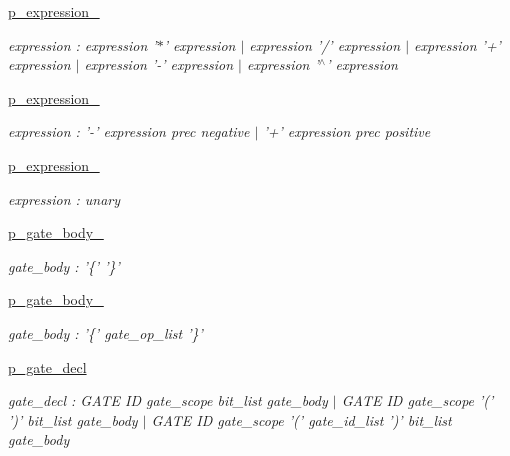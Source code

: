 \begin{DoxyCompactItemize}
\hyperlink{namespaceqat_1_1interop_1_1qasm__parser_1_1OqasmParser_1_1p__expression__0}{p\-\_\-expression\-\_}
\begin{DoxyCompactList}\small\item\em expression \-: expression '$\ast$' expression $|$ expression '/' expression $|$ expression '+' expression $|$ expression '-\/' expression $|$ expression '$^\wedge$' expression \end{DoxyCompactList}\item 
\hyperlink{namespaceqat_1_1interop_1_1qasm__parser_1_1OqasmParser_1_1p__expression__1}{p\-\_\-expression\-\_}
\begin{DoxyCompactList}\small\item\em expression \-: '-\/' expression prec negative $|$ '+' expression prec positive \end{DoxyCompactList}\item 
\hyperlink{namespaceqat_1_1interop_1_1qasm__parser_1_1OqasmParser_1_1p__expression__2}{p\-\_\-expression\-\_}
\begin{DoxyCompactList}\small\item\em expression \-: unary \end{DoxyCompactList}\item 
\hyperlink{namespaceqat_1_1interop_1_1qasm__parser_1_1OqasmParser_1_1p__gate__body__0}{p\-\_\-gate\-\_\-body\-\_}
\begin{DoxyCompactList}\small\item\em gate\-\_\-body \-: '\{' '\}' \end{DoxyCompactList}\item 
\hyperlink{namespaceqat_1_1interop_1_1qasm__parser_1_1OqasmParser_1_1p__gate__body__1}{p\-\_\-gate\-\_\-body\-\_}
\begin{DoxyCompactList}\small\item\em gate\-\_\-body \-: '\{' gate\-\_\-op\-\_\-list '\}' \end{DoxyCompactList}\item 
\hyperlink{namespaceqat_1_1interop_1_1qasm__parser_1_1OqasmParser_1_1p__gate__decl}{p\-\_\-gate\-\_\-decl}
\begin{DoxyCompactList}\small\item\em gate\-\_\-decl \-: G\-A\-T\-E I\-D gate\-\_\-scope bit\-\_\-list gate\-\_\-body $|$ G\-A\-T\-E I\-D gate\-\_\-scope '(' ')' bit\-\_\-list gate\-\_\-body $|$ G\-A\-T\-E I\-D gate\-\_\-scope '(' gate\-\_\-id\-\_\-list ')' bit\-\_\-list gate\-\_\-body \end{DoxyCompactList}\item 

\end{DoxyCompactItemize}
